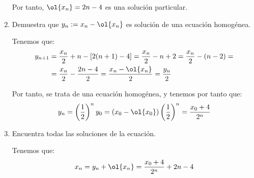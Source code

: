 \begin{ejercicio*}
\begin{enumerate}
        Por tanto, $\ol{x_{n}}=2n -4$ es una solución particular.
        
        \item Demuestra que $y_n:=x_n-\ol{x_n}$ es solución de una ecuación homogénea.

        Tenemos que:
        \begin{align*}
            y_{n+1} &= \frac{x_n}{2} + n - [2(n+1)-4]
            = \frac{x_n}{2} -n +2
            = \frac{x_n}{2} -(n-2)
            =\\&= \frac{x_n}{2} - \frac{2n-4}{2}
            = \frac{x_n-\ol{x_n}}{2}
            = \frac{y_n}{2}
        \end{align*}

        Por tanto, se trata de una ecuación homogénea, y tenemos por tanto que:
        \begin{equation*}
            y_n = \left(\frac{1}{2}\right)^ny_0
            = (x_0 - \ol{x_0})\left(\frac{1}{2}\right)^n
            = \frac{x_0+4}{2^n}
        \end{equation*}
        
        \item Encuentra todas las soluciones de la ecuación.

        Tenemos que:
        \begin{equation*}
            x_n = y_n + \ol{x_n}
            = \frac{x_0+4}{2^n} + 2n-4
        \end{equation*}
    \end{enumerate}
\end{ejercicio*}

